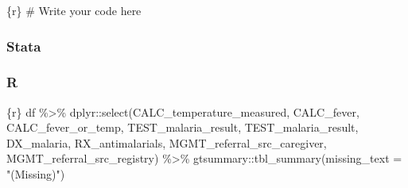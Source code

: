 \documentclass[
  letterpaper,
  DIV=11,
  numbers=noendperiod,
  oneside]{scrreprt}
\newenvironment{Shaded}{\begin{snugshade}}{\end{snugshade}}
\newcommand{\AttributeTok}[1]{\textcolor[rgb]{0.40,0.45,0.13}{#1}}
\newcommand{\CommentTok}[1]{\textcolor[rgb]{0.37,0.37,0.37}{#1}}
\newcommand{\FunctionTok}[1]{\textcolor[rgb]{0.28,0.35,0.67}{#1}}
\newcommand{\InformationTok}[1]{\textcolor[rgb]{0.37,0.37,0.37}{#1}}
\newcommand{\NormalTok}[1]{\textcolor[rgb]{0.00,0.23,0.31}{#1}}
\newcommand{\SpecialCharTok}[1]{\textcolor[rgb]{0.37,0.37,0.37}{#1}}
\newcommand{\StringTok}[1]{\textcolor[rgb]{0.13,0.47,0.30}{#1}}
\begin{document}
\begin{Shaded}
\begin{Highlighting}[]
\InformationTok{\textasciigrave{}\textasciigrave{}\textasciigrave{}\{r\}}
\CommentTok{\# Write your code here}
\InformationTok{\textasciigrave{}\textasciigrave{}\textasciigrave{}}
\end{Highlighting}
\end{Shaded}

\subsubsection{Stata}

\subsubsection{R}

\begin{Shaded}
\begin{Highlighting}[]
\InformationTok{\textasciigrave{}\textasciigrave{}\textasciigrave{}\{r\}}
\NormalTok{df }\SpecialCharTok{\%\textgreater{}\%}
\NormalTok{  dplyr}\SpecialCharTok{::}\FunctionTok{select}\NormalTok{(CALC\_temperature\_measured,}
\NormalTok{                CALC\_fever,}
\NormalTok{                CALC\_fever\_or\_temp,}
\NormalTok{                TEST\_malaria\_result,}
\NormalTok{                TEST\_malaria\_result,}
\NormalTok{                DX\_malaria,}
\NormalTok{                RX\_antimalarials,}
\NormalTok{                MGMT\_referral\_src\_caregiver,}
\NormalTok{                MGMT\_referral\_src\_registry) }\SpecialCharTok{\%\textgreater{}\%}
\NormalTok{  gtsummary}\SpecialCharTok{::}\FunctionTok{tbl\_summary}\NormalTok{(}\AttributeTok{missing\_text =} \StringTok{"(Missing)"}\NormalTok{)}
\InformationTok{\textasciigrave{}\textasciigrave{}\textasciigrave{}}
\end{Highlighting}
\end{Shaded}
\end{document}
